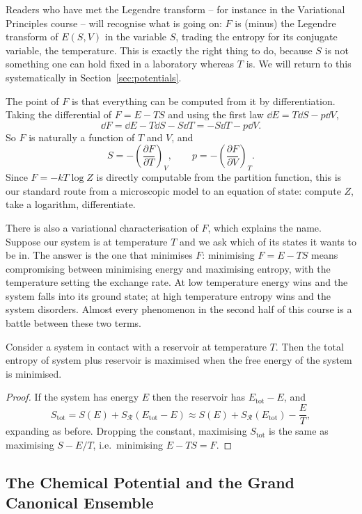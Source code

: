 \documentclass[a4paper]{scrartcl}
\begin{document}
Readers who have met the Legendre transform -- for instance in the Variational Principles course -- will recognise what is going on: $F$ is (minus) the Legendre transform of $E(S,V)$ in the variable $S$, trading the entropy for its conjugate variable, the temperature. This is exactly the right thing to do, because $S$ is not something one can hold fixed in a laboratory whereas $T$ is. We will return to this systematically in Section~\ref{sec:potentials}.

The point of $F$ is that everything can be computed from it by differentiation. Taking the differential of $F = E - TS$ and using the first law $\dd E = T\dd S - p \dd V$,
$$
\dd F = \dd E - T\dd S - S \dd T = -S\dd T - p\dd V.
$$
So $F$ is naturally a function of $T$ and $V$, and
$$
S = -\left(\frac{\partial F}{\partial T}\right)_V, \qquad p = -\left(\frac{\partial F}{\partial V}\right)_T.
$$
Since $F = -kT\log Z$ is directly computable from the partition function, this is our standard route from a microscopic model to an equation of state: compute $Z$, take a logarithm, differentiate.

There is also a variational characterisation of $F$, which explains the name. Suppose our system is at temperature $T$ and we ask which of its states it wants to be in. The answer is the one that minimises $F$: minimising $F = E - TS$ means compromising between minimising energy and maximising entropy, with the temperature setting the exchange rate. At low temperature energy wins and the system falls into its ground state; at high temperature entropy wins and the system disorders. Almost every phenomenon in the second half of this course is a battle between these two terms.

\begin{proposition}
	Consider a system in contact with a reservoir at temperature $T$. Then the total entropy of system plus reservoir is maximised when the free energy of the system is minimised.
\end{proposition}
\begin{proof}
	If the system has energy $E$ then the reservoir has $E_{\mathrm{tot}} - E$, and
	$$
	S_{\mathrm{tot}} = S(E) + S_{\mathcal R}(E_{\mathrm{tot}} - E) \approx S(E) + S_{\mathcal R}(E_{\mathrm{tot}}) - \frac{E}{T},
	$$
	expanding as before. Dropping the constant, maximising $S_{\mathrm{tot}}$ is the same as maximising $S - E/T$, i.e.\ minimising $E - TS = F$.
\end{proof}

\subsection{The Chemical Potential and the Grand Canonical Ensemble}
\end{document}

